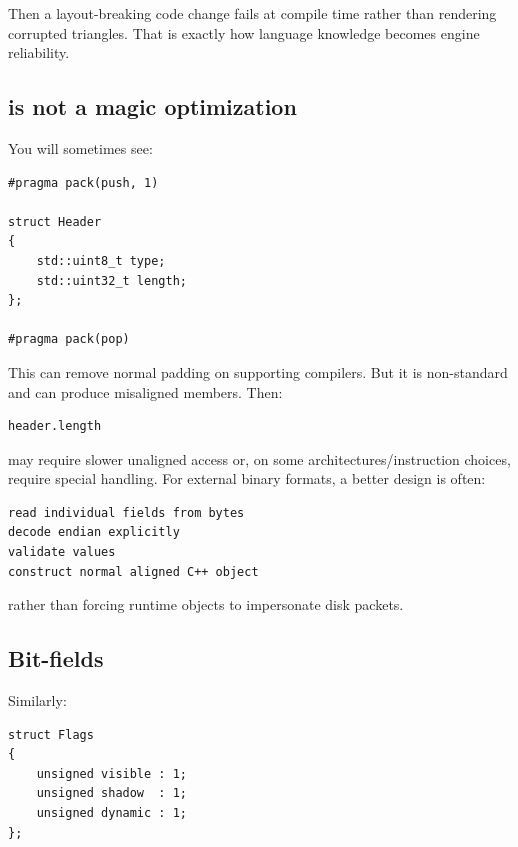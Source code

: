 Then a layout-breaking code change fails at compile time rather than rendering corrupted triangles. That is exactly how language knowledge becomes engine reliability.

\subsection{\texorpdfstring{ is not a magic optimization}{ is not a magic optimization}}\label{05-engine-i-ch003-pragma-pack-is-not-a-magic-optimization}

\hypertarget{05-engine-i-ch003-pragma-pack-is-not-a-magic-optimization}{}

You will sometimes see:

\begin{verbatim}
#pragma pack(push, 1)

struct Header
{
    std::uint8_t type;
    std::uint32_t length;
};

#pragma pack(pop)
\end{verbatim}

This can remove normal padding on supporting compilers. But it is non-standard and can produce misaligned members. Then:

\begin{verbatim}
header.length
\end{verbatim}

may require slower unaligned access or, on some architectures/instruction choices, require special handling. For external binary formats, a better design is often:

\begin{verbatim}
read individual fields from bytes
decode endian explicitly
validate values
construct normal aligned C++ object
\end{verbatim}

rather than forcing runtime objects to impersonate disk packets.

\subsection{Bit-fields}\label{05-engine-i-ch003-bit-fields}

\hypertarget{05-engine-i-ch003-bit-fields}{}

Similarly:

\begin{verbatim}
struct Flags
{
    unsigned visible : 1;
    unsigned shadow  : 1;
    unsigned dynamic : 1;
};
\end{verbatim}

